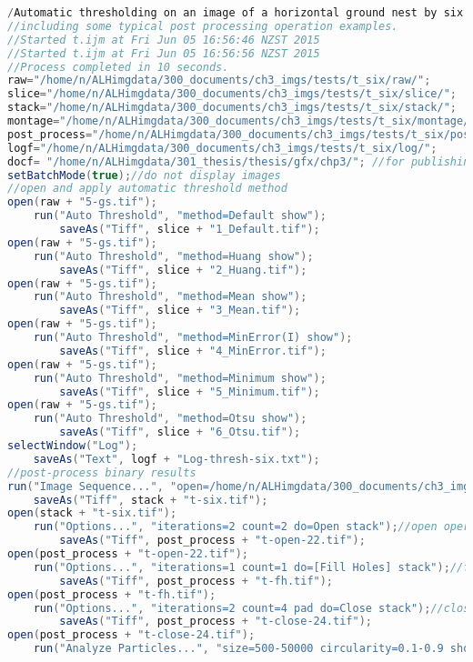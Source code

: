 \begin{lstlisting}[language=java, caption=Thresholding by six common methods., label=cd:threshold-six-post]
/Automatic thresholding on an image of a horizontal ground nest by six schemes,
//including some typical post processing operation examples. 
//Started t.ijm at Fri Jun 05 16:56:46 NZST 2015 
//Started t.ijm at Fri Jun 05 16:56:56 NZST 2015
//Process completed in 10 seconds.
raw="/home/n/ALHimgdata/300_documents/ch3_imgs/tests/t_six/raw/"; 
slice="/home/n/ALHimgdata/300_documents/ch3_imgs/tests/t_six/slice/"; 
stack="/home/n/ALHimgdata/300_documents/ch3_imgs/tests/t_six/stack/"; 
montage="/home/n/ALHimgdata/300_documents/ch3_imgs/tests/t_six/montage/"; 
post_process="/home/n/ALHimgdata/300_documents/ch3_imgs/tests/t_six/post_process/"; 
logf="/home/n/ALHimgdata/300_documents/ch3_imgs/tests/t_six/log/"; 
docf= "/home/n/ALHimgdata/301_thesis/thesis/gfx/chp3/"; //for publishing images
setBatchMode(true);//do not display images
//open and apply automatic threshold method
open(raw + "5-gs.tif");
	run("Auto Threshold", "method=Default show");
		saveAs("Tiff", slice + "1_Default.tif");
open(raw + "5-gs.tif");
	run("Auto Threshold", "method=Huang show");
		saveAs("Tiff", slice + "2_Huang.tif"); 
open(raw + "5-gs.tif");
	run("Auto Threshold", "method=Mean show");
		saveAs("Tiff", slice + "3_Mean.tif");
open(raw + "5-gs.tif");
	run("Auto Threshold", "method=MinError(I) show");
		saveAs("Tiff", slice + "4_MinError.tif");
open(raw + "5-gs.tif");
	run("Auto Threshold", "method=Minimum show");
		saveAs("Tiff", slice + "5_Minimum.tif"); 
open(raw + "5-gs.tif");
	run("Auto Threshold", "method=Otsu show");
		saveAs("Tiff", slice + "6_Otsu.tif");  
selectWindow("Log"); 
	saveAs("Text", logf + "Log-thresh-six.txt");
//post-process binary results
run("Image Sequence...", "open=/home/n/ALHimgdata/300_documents/ch3_imgs/tests/t_six/slice/1-Default.tif sort");
	saveAs("Tiff", stack + "t-six.tif");
open(stack + "t-six.tif");
	run("Options...", "iterations=2 count=2 do=Open stack");//open operator
		saveAs("Tiff", post_process + "t-open-22.tif");
open(post_process + "t-open-22.tif");		
	run("Options...", "iterations=1 count=1 do=[Fill Holes] stack");//fill holes
		saveAs("Tiff", post_process + "t-fh.tif");
open(post_process + "t-fh.tif");	
	run("Options...", "iterations=2 count=4 pad do=Close stack");//close operator
		saveAs("Tiff", post_process + "t-close-24.tif");
open(post_process + "t-close-24.tif");	
	run("Analyze Particles...", "size=500-50000 circularity=0.1-0.9 show=Outlines display clear summarize in_situ stack");//particle count

\end{lstlisting}
